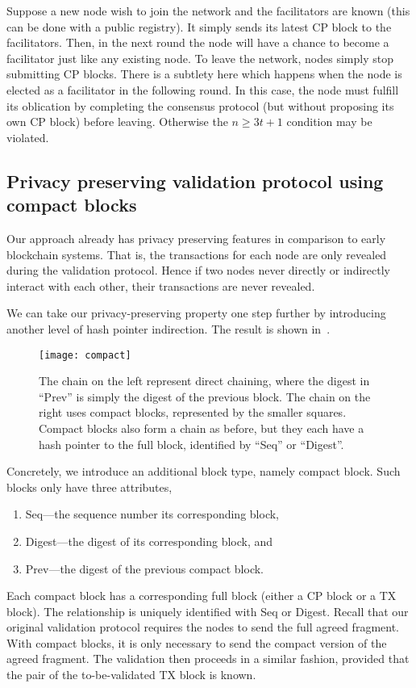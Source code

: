 Suppose a new node wish to join the network and the facilitators are known (this can be done with a public registry).
It simply sends its latest CP block to the facilitators.
Then, in the next round the node will have a chance to become a facilitator just like any existing node.
To leave the network, nodes simply stop submitting CP blocks.
There is a subtlety here which happens when the node is elected as a facilitator in the following round.
In this case, the node must fulfill its oblication by completing the consensus protocol (but without proposing its own CP block) before leaving.
Otherwise the $n \ge 3t + 1$ condition may be violated.

\subsection{Privacy preserving validation protocol using compact blocks}
\label{sec:compact}
Our approach already has privacy preserving features in comparison to early blockchain systems.
That is, the transactions for each node are only revealed during the validation protocol.
Hence if two nodes never directly or indirectly interact with each other,
their transactions are never revealed.

We can take our privacy-preserving property one step further by introducing another level of hash pointer indirection.
The result is shown in~.
\begin{figure}
    \texttt{[image: compact]}
    \centering
    \caption{The chain on the left represent direct chaining, where the digest in ``Prev'' is simply the digest of the previous block.
    The chain on the right uses compact blocks, represented by the smaller squares.
    Compact blocks also form a chain as before, but they each have a hash pointer to the full block, identified by ``Seq'' or ``Digest''.}
    \label{fig:compact}
\end{figure}

Concretely, we introduce an additional block type,
namely compact block.
Such blocks only have three attributes,
\begin{enumerate}
\item Seq---the sequence number its corresponding block,
\item Digest---the digest of its corresponding block, and
\item Prev---the digest of the previous compact block.
\end{enumerate}
Each compact block has a corresponding full block (either a CP block or a TX block).
The relationship is uniquely identified with Seq or Digest.
Recall that our original validation protocol requires the nodes to send the full agreed fragment.
With compact blocks, it is only necessary to send the compact version of the agreed fragment.
The validation then proceeds in a similar fashion,
provided that the pair of the to-be-validated TX block is known.

